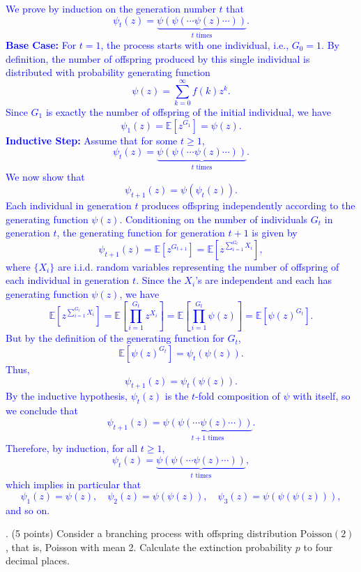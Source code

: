 \documentclass{article}
\begin{document}
\textcolor{blue}{
    We prove by induction on the generation number \( t \) that
\[
\psi_t(z) = \underbrace{\psi(\psi(\cdots \psi(z) \cdots))}_{t \text{ times}}.
\]
\textbf{Base Case:} For \( t = 1 \), the process starts with one individual, i.e., \( G_0 = 1 \). By definition, the number of offspring produced by this single individual is distributed with probability generating function
\[
\psi(z) = \sum_{k=0}^{\infty} f(k)z^k.
\]
Since \( G_1 \) is exactly the number of offspring of the initial individual, we have
\[
\psi_1(z) = \mathbb{E}[z^{G_1}] = \psi(z).
\]
\textbf{Inductive Step:} Assume that for some \( t \ge 1 \),
\[
\psi_t(z) = \underbrace{\psi(\psi(\cdots \psi(z) \cdots))}_{t \text{ times}}.
\]
We now show that
\[
\psi_{t+1}(z) = \psi(\psi_t(z)).
\]
Each individual in generation \( t \) produces offspring independently according to the generating function \( \psi(z) \). Conditioning on the number of individuals \( G_t \) in generation \( t \), the generating function for generation \( t+1 \) is given by
\[
\psi_{t+1}(z) = \mathbb{E}[z^{G_{t+1}}] = \mathbb{E}\left[z^{\sum_{i=1}^{G_t} X_i}\right],
\]
where \( \{X_i\} \) are i.i.d. random variables representing the number of offspring of each individual in generation \( t \). Since the \( X_i \)'s are independent and each has generating function \( \psi(z) \), we have
\[
\mathbb{E}\left[z^{\sum_{i=1}^{G_t} X_i}\right] = \mathbb{E}\left[\prod_{i=1}^{G_t} z^{X_i}\right] = \mathbb{E}\left[\prod_{i=1}^{G_t} \psi(z)\right] = \mathbb{E}\left[\psi(z)^{G_t}\right].
\]
But by the definition of the generating function for \( G_t \),
\[
\mathbb{E}\left[\psi(z)^{G_t}\right] = \psi_t(\psi(z)).
\]
Thus,
\[
\psi_{t+1}(z) = \psi_t(\psi(z)).
\]
By the inductive hypothesis, \( \psi_t(z) \) is the \( t \)-fold composition of \( \psi \) with itself, so we conclude that
\[
\psi_{t+1}(z) = \underbrace{\psi(\psi(\cdots \psi(z) \cdots))}_{t+1 \text{ times}}.
\]
Therefore, by induction, for all \( t \geq 1 \),
\[
\psi_t(z) = \underbrace{\psi(\psi(\cdots \psi(z) \cdots))}_{t \text{ times}},
\]
which implies in particular that
\[
\psi_1(z) = \psi(z), \quad \psi_2(z) = \psi(\psi(z)), \quad \psi_3(z) = \psi(\psi(\psi(z))),
\]
and so on.
}


. (5 points) Consider a branching process with offspring distribution $\text{Poisson}(2)$, that is, Poisson with mean 2. Calculate the extinction probability $p$ to four decimal places.
\end{document}
